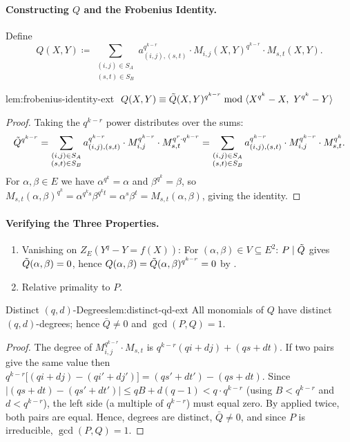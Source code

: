 \paragraph*{Constructing $Q$ and the Frobenius Identity.}
Define
$$Q(X,Y)\coloneqq\sum_{\substack{(i,j)\in S_A\\(s,t)\in S_B}}a_{(i,j),(s,t)}^{q^{k-r}}\cdot M_{i,j}(X,Y)^{q^{k-r}}\cdot M_{s,t}(X,Y).$$
\begin{lemma}{}{lem:frobenius-identity-ext}
$\ Q(X,Y)\equiv\tdQ(X,Y)^{q^{k-r}}\bmod{\langle X^{q^k}-X,\ Y^{q^k}-Y\rangle}$
\end{lemma}
\begin{proof}
  Taking the $q^{k-r}$ power distributes over the sums: $$\tilde{Q}^{q^{k-r}}=\sum_{\substack{(i,j)\in S_A\\(s,t)\in S_B}} a_{(i,j),(s,t)}^{q^{k-r}}\cdot M_{i,j}^{q^{k-r}}\cdot M_{s,t}^{q^r\cdot q^{k-r}}=\sum_{\substack{(i,j)\in S_A\\(s,t)\in S_B}} a_{(i,j),(s,t)}^{q^{k-r}}\cdot M_{i,j}^{q^{k-r}}\cdot M_{s,t}^{q^k}.$$ For $\alpha,\beta\in E$ we have $\alpha^{q^k}=\alpha$ and $\beta^{q^k}=\beta$, so $M_{s,t}(\alpha,\beta)^{q^k}=\alpha^{q^k s}\beta^{q^k t}=\alpha^s\beta^t=M_{s,t}(\alpha,\beta)$, giving the identity.
\end{proof}

\paragraph*{Verifying the Three Properties.}

\begin{enumerate}[label=(\roman*)]
  \item Vanishing on $Z_E(Y^q-Y=f(X))$: For $(\alpha,\beta)\in V\subseteq E^2$: $P\mid\tilde{Q}$ gives $\tilde{Q}(\alpha,\beta)=0$, hence $Q(\alpha,\beta)=\tilde{Q}(\alpha,\beta)^{q^{k-r}}=0$ by \FrobeniusIdentityExtlem.
  \item Relative primality to $P$.
\end{enumerate}

\begin{lemma}{Distinct $(q,d)$-Degrees}{lem:distinct-qd-ext}
  All monomials of $Q$ have distinct $(q,d)$-degrees; hence $\bar{Q}\neq 0$ and $\gcd(P,Q)=1$.
\end{lemma}
\begin{proof}
  The degree of $M_{i,j}^{q^{k-r}}\cdot M_{s,t}$ is $q^{k-r}(qi+dj)+(qs+dt)$. If two pairs give the same value then $q^{k-r}\bigl[(qi+dj)-(qi'+dj')\bigr]=(qs'+dt')-(qs+dt)$. Since $|(qs+dt)-(qs'+dt')|\leq qB+d(q-1)<q\cdot q^{k-r}$ (using $B<q^{k-r}$ and $d<q^{k-r}$), the left side (a multiple of $q^{k-r}$) must equal zero. By \QDInjectivitylem applied twice, both pairs are equal. Hence, degrees are distinct, $\bar{Q}\neq 0$, and since $P$ is irreducible, $\gcd(P,Q)=1$.
\end{proof}

